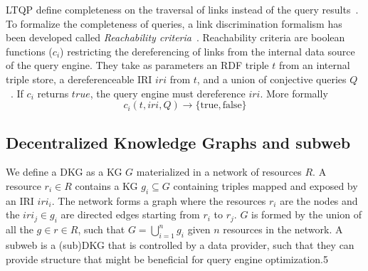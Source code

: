 LTQP define completeness on the traversal of links instead of the query results~\cite{Hartig2012}.
To formalize the completeness of queries, a link discrimination formalism has been developed called \emph{Reachability criteria}~\cite{Hartig2012}.
Reachability criteria are boolean functions ($c_i$) restricting the dereferencing of links from the internal data source of the query engine.
They take as parameters an RDF triple $t$ from an internal triple store, a dereferenceable IRI $iri$ from $t$, and a union of conjective queries $Q$~\cite{Hartig2012}.
If $c_i$ returns $true$, the query engine must dereference $iri$.
More formally
\begin{equation}\label{eq:reachabilityCriteria}
c_i(t, iri, Q) \rightarrow \{\mathrm{true}, \mathrm{false}\}
\end{equation}

\subsection{Decentralized Knowledge Graphs and subweb}

We define a DKG as a KG $G$ materialized in a network of resources $R$.
A resource $r_i \in R$ contains a KG $g_i \subseteq G$ containing triples mapped and exposed by an IRI $iri_i$.
The network forms a graph where the resources $r_i$ are the nodes and the $iri_j \in g_i$ are directed edges starting from $r_i$ to $r_j$.
$G$ is formed by the union of all the $g \in r \in R$, such that $G = \bigcup_{i=1}^{n}g_i$ given $n$ resources in the network.
A subweb is a (sub)DKG that is controlled by a data provider, such that they can provide structure that might be beneficial for query engine optimization.5
